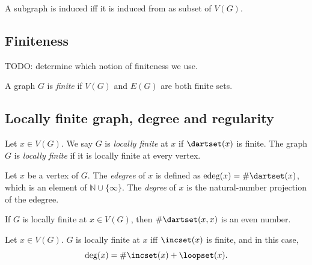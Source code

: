 \begin{lemma}
  \label{lem:induced_iff_isinduced}
  A subgraph is induced iff it is induced from as subset of $V(G)$.
\end{lemma}

\subsection{Finiteness}

TODO: determine which notion of finiteness we use.

\begin{definition}
  \label{def:finite}
  A graph $G$ is \emph{finite} if $V(G)$ and $E(G)$ are both finite sets.
\end{definition}


\subsection{Locally finite graph, degree and regularity}

\begin{definition}
  \label{def:locally_finite}
    \leanok
  Let $x \in V(G)$.
  We say $G$ is \emph{locally finite} at $x$ if $\dartset (x)$ is finite.
  The graph $G$ is \emph{locally finite} if it is locally finite at every vertex.
\end{definition}

\begin{definition}
  \label{def:degree}
  \leanok
  Let $x$ be a vertex of $G$.
  The \emph{edegree} of $x$ is defined as $\mathrm{edeg}(x) = \# \dartset(x)$, which is
  an element of $\mathbb{N} \cup \{ \infty\}$.
  The \emph{degree} of $x$ is the natural-number projection of the edegree.
\end{definition}

\begin{lemma}
  \label{lem:darset_loop_even}
  If $G$ is locally finite at $x \in V(G)$, then
   $\# \dartset(x,x)$ is an even number.
\end{lemma}

\begin{lemma}
  \label{lem:degree_inc_loop}
  Let $x \in V(G)$.
  $G$ is locally finite at $x$ iff $\incset(x)$ is finite, and in this case,
  \begin{equation*}
    \deg(x) = \# \incset(x) + \loopset(x).
  \end{equation*}
\end{lemma}


